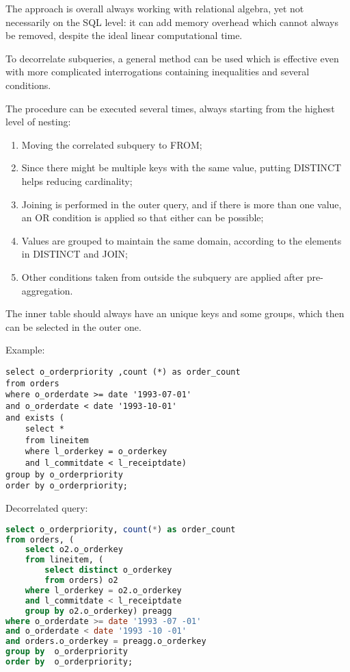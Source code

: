 The approach is overall always working with relational algebra, yet not necessarily on the SQL level: it can add memory overhead which cannot always be removed, despite the ideal linear computational time.

To decorrelate subqueries, a general method can be used which is effective even with more complicated interrogations containing inequalities and several conditions.

The procedure can be executed several times, always starting from the highest level of nesting:
\begin{enumerate}
	\item Moving the correlated subquery to FROM;
	\item Since there might be multiple keys with the same value, putting DISTINCT helps reducing cardinality;
	\item Joining is performed in the outer query, and if there is more than one value, an OR condition is applied so that either can be possible;
	\item Values are grouped to maintain the same domain, according to the elements in DISTINCT and JOIN;
	\item Other conditions taken from outside the subquery are applied after pre-aggregation.
\end{enumerate}

The inner table should always have an unique keys and some groups, which then can be selected in the outer one.

Example:
\begin{lstlisting}
select o_orderpriority ,count (*) as order_count
from orders
where o_orderdate >= date '1993-07-01'
and o_orderdate < date '1993-10-01'
and exists (
	select * 
	from lineitem
	where l_orderkey = o_orderkey
	and l_commitdate < l_receiptdate)
group by o_orderpriority
order by o_orderpriority;
\end{lstlisting}

Decorrelated query:
\begin{lstlisting}[language=SQL]
select o_orderpriority, count(*) as order_count
from orders, (
	select o2.o_orderkey
	from lineitem, (
		select distinct o_orderkey 
		from orders) o2
	where l_orderkey = o2.o_orderkey
	and l_commitdate < l_receiptdate
	group by o2.o_orderkey) preagg
where o_orderdate >= date '1993 -07 -01' 
and o_orderdate < date '1993 -10 -01' 
and orders.o_orderkey = preagg.o_orderkey
group by  o_orderpriority
order by  o_orderpriority;
\end{lstlisting}
